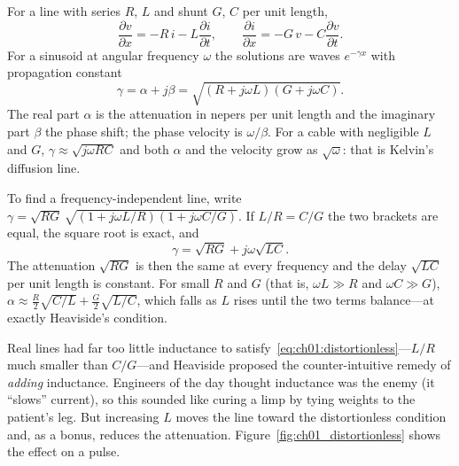 \begin{deeper}
For a line with series $R$, $L$ and shunt $G$, $C$ per unit length,
\begin{equation}
\frac{\partial v}{\partial x} = -R\,i - L\frac{\partial i}{\partial t},\qquad
\frac{\partial i}{\partial x} = -G\,v - C\frac{\partial v}{\partial t}.
\label{eq:ch01:telegrapher}
\end{equation}
For a sinusoid at angular frequency $\omega$ the solutions are waves $e^{-\gamma x}$ with
propagation constant
\begin{equation}
\gamma = \alpha + j\beta = \sqrt{(R+j\omega L)(G+j\omega C)}.
\label{eq:ch01:gamma}
\end{equation}
The real part $\alpha$ is the attenuation in nepers per unit length and the imaginary part $\beta$
the phase shift; the phase velocity is $\omega/\beta$. For a cable with negligible $L$ and $G$,
$\gamma\approx\sqrt{j\omega RC}$ and both $\alpha$ and the velocity grow as $\sqrt\omega$: that is
Kelvin's diffusion line.

To find a frequency-independent line, write
$\gamma = \sqrt{RG}\,\sqrt{(1+j\omega L/R)(1+j\omega C/G)}$. If $L/R=C/G$ the two brackets are equal,
the square root is exact, and
\[
\gamma = \sqrt{RG} + j\omega\sqrt{LC}.
\]
The attenuation $\sqrt{RG}$ is then the same at every frequency and the delay $\sqrt{LC}$ per unit
length is constant. For small $R$ and $G$ (that is, $\omega L\gg R$ and $\omega C\gg G$),
$\alpha\approx \tfrac{R}{2}\sqrt{C/L} + \tfrac{G}{2}\sqrt{L/C}$, which falls as $L$ rises until the two
terms balance---at exactly Heaviside's condition.
\end{deeper}

Real lines had far too little inductance to satisfy~\eqref{eq:ch01:distortionless}---$L/R$ much
smaller than $C/G$---and Heaviside proposed the counter-intuitive remedy of \emph{adding} inductance.
Engineers of the day thought inductance was the enemy (it ``slows'' current), so this sounded like
curing a limp by tying weights to the patient's leg. But increasing $L$ moves the line toward the
distortionless condition and, as a bonus, reduces the attenuation. Figure~\ref{fig:ch01_distortionless}
shows the effect on a pulse.



